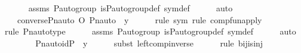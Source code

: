\begin{isabellebody}
\ \ \ \ \isamarkupfalse%
\ assms\ {\isasymG}{\isacharunderscore}{\kern0pt}P{\isacharunderscore}{\kern0pt}auto{\isacharunderscore}{\kern0pt}group\ is{\isacharunderscore}{\kern0pt}P{\isacharunderscore}{\kern0pt}auto{\isacharunderscore}{\kern0pt}group{\isacharunderscore}{\kern0pt}def\ sym{\isacharunderscore}{\kern0pt}def\isanewline
\ \ \ \ \isamarkupfalse%
\ auto\isanewline
\ \ \isamarkupfalse%
\ \isamarkupfalse%
\ {\isachardoublequoteopen}{\isachardot}{\kern0pt}{\isachardot}{\kern0pt}{\isachardot}{\kern0pt}\ {\isacharequal}{\kern0pt}\ {\isacharparenleft}{\kern0pt}converse{\isacharparenleft}{\kern0pt}Pn{\isacharunderscore}{\kern0pt}auto{\isacharparenleft}{\kern0pt}{\isasympi}{\isacharparenright}{\kern0pt}{\isacharparenright}{\kern0pt}\ O\ Pn{\isacharunderscore}{\kern0pt}auto{\isacharparenleft}{\kern0pt}{\isasympi}{\isacharparenright}{\kern0pt}{\isacharparenright}{\kern0pt}\ {\isacharbackquote}{\kern0pt}\ y{\isachardoublequoteclose}\ \isanewline
\ \ \ \ \isamarkupfalse%
{\isacharparenleft}{\kern0pt}rule\ sym{\isacharcomma}{\kern0pt}\ rule\ comp{\isacharunderscore}{\kern0pt}fun{\isacharunderscore}{\kern0pt}apply{\isacharparenright}{\kern0pt}\isanewline
\ \ \ \ \ \isamarkupfalse%
{\isacharparenleft}{\kern0pt}rule\ Pn{\isacharunderscore}{\kern0pt}auto{\isacharunderscore}{\kern0pt}type{\isacharparenright}{\kern0pt}\isanewline
\ \ \ \ \isamarkupfalse%
\ assms\ {\isasymG}{\isacharunderscore}{\kern0pt}P{\isacharunderscore}{\kern0pt}auto{\isacharunderscore}{\kern0pt}group\ is{\isacharunderscore}{\kern0pt}P{\isacharunderscore}{\kern0pt}auto{\isacharunderscore}{\kern0pt}group{\isacharunderscore}{\kern0pt}def\ sym{\isacharunderscore}{\kern0pt}def\isanewline
\ \ \ \ \isamarkupfalse%
\ auto\ \isanewline
\ \ \isamarkupfalse%
\ \isamarkupfalse%
\ {\isachardoublequoteopen}{\isachardot}{\kern0pt}{\isachardot}{\kern0pt}{\isachardot}{\kern0pt}\ {\isacharequal}{\kern0pt}\ Pn{\isacharunderscore}{\kern0pt}auto{\isacharparenleft}{\kern0pt}id{\isacharparenleft}{\kern0pt}P{\isacharparenright}{\kern0pt}{\isacharparenright}{\kern0pt}\ {\isacharbackquote}{\kern0pt}\ y{\isachardoublequoteclose}\ \isanewline
\ \ \ \ \isamarkupfalse%
{\isacharparenleft}{\kern0pt}subst\ left{\isacharunderscore}{\kern0pt}comp{\isacharunderscore}{\kern0pt}inverse{\isacharparenright}{\kern0pt}\isanewline
\ \ \ \ \ \isamarkupfalse%
{\isacharparenleft}{\kern0pt}rule\ bij{\isacharunderscore}{\kern0pt}is{\isacharunderscore}{\kern0pt}inj{\isacharparenright}{\kern0pt}\isanewline

\end{isabellebody}

